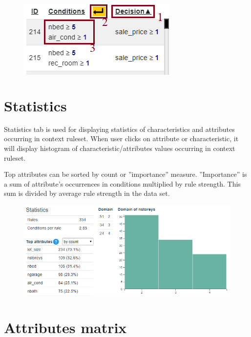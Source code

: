 \documentclass[12pt]{article}
\begin{document}
\begin{figure}[H]
    \centering
    \includegraphics{figures/B-list.png}
\end{figure}

\section{Statistics}

Statistics tab is used for displaying statistics of characteristics and attributes occurring in context ruleset. When user clicks on attribute or characteristic, it will display histogram of characteristic/attributes values occurring in context ruleset.

Top attributes can be sorted by count or ''importance'' measure. ''Importance'' is a sum of attribute's occurrences in conditions multiplied by rule strength. This sum is divided by average rule strength in the data set.

\begin{figure}[H]
    \centering
    \includegraphics[width=\textwidth]{figures/B-statistics.png}
\end{figure}

\section{Attributes matrix}
\end{document}
